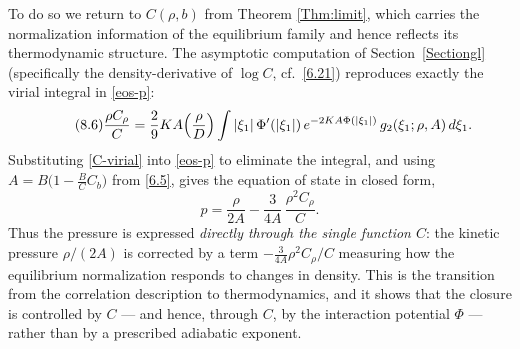 \documentclass[11pt]{article}
\begin{document}
To do so we return to $C(\rho,b)$ from Theorem \ref{Thm:limit}, which carries the normalization information of the equilibrium family and hence reflects its thermodynamic structure. The asymptotic computation of Section~\ref{Sectiongl} (specifically the density-derivative of $\log C$, cf.\ \eqref{6.21}) reproduces exactly the virial integral in \eqref{eos-p}:
\begin{equation}\label{C-virial}\tag{8.6}
\frac{\rho C_\rho}{C}
 = \frac{2}{9}KA\Bigl(\frac{\rho}{D}\Bigr)
   \int |\xi_1|\,\Phi'(|\xi_1|)\,
   e^{-2KA\Phi(|\xi_1|)}\, g_2(\xi_1;\rho,A)\,d\xi_1.
\end{equation}
Substituting \eqref{C-virial} into \eqref{eos-p} to eliminate the integral, and using $A=B\big(1-\tfrac{B}{C}C_b\big)$ from \eqref{6.5}, gives the equation of state in closed form,
\begin{equation}\label{eos-C}\tag{8.7}
p = \frac{\rho}{2A} - \frac{3}{4A}\,\frac{\rho^2 C_\rho}{C}.
\end{equation}
Thus the pressure is expressed \emph{directly through the single function $C$}: the kinetic pressure $\rho/(2A)$ is corrected by a term $-\tfrac{3}{4A}\rho^2 C_\rho/C$ measuring how the equilibrium normalization responds to changes in density. This is the transition from the correlation description to thermodynamics, and it shows that the closure is controlled by $C$ --- and hence, through $C$, by the interaction potential $\Phi$ --- rather than by a prescribed adiabatic exponent.
\end{document}
